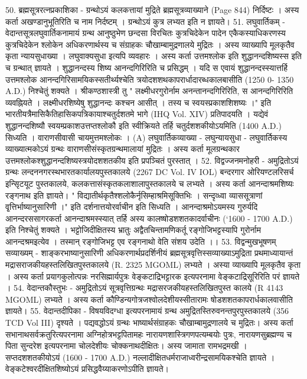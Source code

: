50. ब्रह्मसूत्ररत्नप्रकाशिका -
ग्रन्थोऽयं कलकत्तायां मुद्रिते ब्रह्मसूत्रव्याख्याने (Page 844) निर्दिष्टः । अस्य कर्ता अखण्डानुभूतिरिति च नाम निर्दष्टम् । ग्रन्थोऽयं कुत्र लभ्यत इति न ज्ञायते। 
51. लघुवार्तिकम् -
वेदान्तसूत्रलघुवार्तिकनामायं ग्रन्थ आनुष्ठुभेण छन्दसा विरचितः कुत्रचिदेकेन पादेन एकैकस्याधिकरणस्य कुत्रचिदेकेन श्लोकेन अधिकरणार्थस्य च संग्राहकः चौखाम्बामुद्रणालये मुद्रितः । अस्य व्याख्यापि मूलकृतैव कृता न्यायसुधाख्या । लघुवाक्यसुधा इत्यपि व्यवहारः । अस्य कर्ता उत्तमश्लोक इति शुद्धानन्दशिष्यस्स इति च ग्रन्थात् ज्ञायते । शुद्धानन्दस्य शिष्य आनन्दगिरिरिति च प्रसिद्धम् । यदि स एवायं शुद्धानन्दस्स्यात्तर्हि उत्तमश्लोक आनन्दगिरिसामयिकस्सतीर्थ्यश्चेति त्रयोदशशथकापरार्धादारब्धकालबासीति (1250 0- 1350 A.D.) निश्चेतुं शक्यते । श्रीकण्ठशास्त्री तु " लक्ष्मीधरगुरोर्नाम अनन्तानन्दगिरिरिति, स आनन्दगिरिरिति व्यवह्नियते । लक्ष्मीधरशिष्येषु शुद्धानन्दः कश्चन आसीत् । तस्य च स्वयस्प्रकाशशिशष्यः ।" इति भारतीयत्रैमासिकैतिहासिकपत्रिकायाश्चतुर्दशतमे भागे (IHQ Vol. XIV) प्रतिपादयति । यद्येवं शुद्धानन्दशिष्यौ स्वयम्प्रकाशउत्तप्तश्लोकौ इति स्वीक्रियते तर्हि चतुर्दशशकीयोऽयमिति (1400 A.D.) सिध्यति । वाराणसीवासी चायमुत्तमश्लोकः । 
(A) लघुवार्तिकव्याख्या - लघुन्यायसुधा -
लघुवार्तिकस्य व्याख्यात्मकोऽयं ग्रन्थः वाराणसीसंस्कृतग्रन्थमालायां मुद्रितः । अस्य कर्ता मूलग्रन्थकार उत्तमश्लोकश्शुद्धानन्दशिष्यस्त्रयोदशशतकीय इति प्रपञ्चितं पुरस्तात् । 
52. विद्वज्जनमनोहरी -
अमुद्रितोऽयं ग्रन्थः लन्दननगरस्थभारतकार्यालयपुस्तकालये (2267 DC Vol. IV IOL) बन्दरगार ओरियण्टलरिसर्च इन्सृिटयूट पुस्तकालये, कलकत्तासंस्कृतकलाशालापुस्तकालये च लभ्यते । अस्य कर्ता आनन्दाश्रमशिष्यः रङ्गनाथ इति ज्ञायते। " विद्यातीर्थकृतैश्शलोकैर्नृसिम्हाश्रमिसूक्तिभिः । सन्दृव्ध्वा व्याससूत्राणां वृ्त्तिर्भाष्यानुसारिणी ।" इति दर्शनात्तयोरर्वाचीन इति सिध्यति । आनन्दाश्रमोऽयमस्य गुरुर्यदि आनन्दरससागरकर्ता आनन्दाश्रमस्स्यात् तर्हि अस्य कालष्षोडशशतकादर्वाचीनः (`1600 - 1700 A.D.) इति निश्चेतुं शक्यते । भट्टोजिदीक्षितस्य भ्रातुः अद्वैतचिन्तामणिकर्तू रङ्गोजिभट्टस्यापि गुरोर्नाम आनन्दश्रमइत्येव । तस्मान् रङ्गोजिभट्ट एव रङ्गनाथो वेति संशय उदेति ।। 
53. विद्वन्मुखभूषणम् सव्याख्यम् -
शाङ्करभाष्यानुसारिणी अधिकरणार्थप्रदर्शिनीयं ब्रह्मसूत्रवृत्तिस्सव्याख्याऽमुद्रिता प्रथमाध्यायान्तं मद्रासराजकीयहस्तलिखितपुस्तकालये (R. 2325 MGOML) लभ्यते । अस्या व्याख्यापि मूलकृतैव कृता । अस्य कर्ता प्रयागकुलोत्पन्नः नरसिह्मार्यपुत्रः वेङ्कटाद्रिभट्टारक इत्यपरनामा वेङ्कटाद्रिसूरिरिति परं ज्ञायते । 
54. वेदान्तकौस्तुभः -
अमुद्रितोऽयं सूत्रवृत्तिग्रन्थः मद्रासरजकीयहस्तलिखितपुस्त कालये (R 4143 MGOML) लभ्यते । अस्य कर्ता कौण्डिन्यगोत्रजश्वोलदेशीयस्सीतारामः षोडशशतकापरार्धकालवासीति ज्ञायते। 
55. वेदान्तदीपिका - 
विषयविदग्धा इत्यपरनामायं ग्रन्थ अमुद्रितस्तिरुवनन्तपुरपुस्तकालये (356 TCD Vol III) दृश्यते । पद्यवद्धोऽयं ग्रन्थः भाष्यार्थसंग्राहकः चौखाम्बामुद्रणालये च मुद्रितः। अस्य कर्ता सभानाथसर्वक्रतुरित्यपरनामा अग्निहोत्रभट्टपितामहः नारायणशास्त्रिगणपत्यम्बयोः पुत्रः, नारायणसुब्रह्मण्य च पिता सुन्दरेश इत्यपरनामा चोलदेशीयः चोक्कनाथदीक्षितः। अस्य जामाता रामभद्रमखी । सप्तदशशतकीयोऽयं (1600 - 1700 A.D.) नल्लादीक्षितधर्मराजाध्वरीन्द्रसामयिकश्चेति ज्ञायते । वेङ्कटेश्वरदीक्षितशिष्योऽयं प्रसिद्धवैय्याकरणोऽपीति ज्ञायते। 
